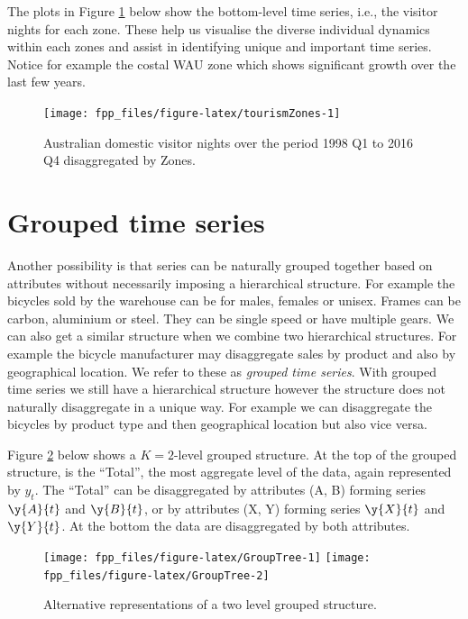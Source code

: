 \documentclass[]{book}
\begin{document}
The plots in Figure \ref{fig:tourismZones} below show the bottom-level time series, i.e., the visitor nights for each zone. These help us visualise the diverse individual dynamics within each zones and assist in identifying unique and important time series. Notice for example the costal WAU zone which shows significant growth over the last few years.

\begin{figure}

{\centering \texttt{[image: fpp\_files/figure-latex/tourismZones-1]} 

}

\caption{Australian domestic visitor nights over the period 1998 Q1 to 2016 Q4 disaggregated by Zones.}\label{fig:tourismZones}
\end{figure}

\hypertarget{Hier:grouped-ts}{%
\section{Grouped time series}\label{Hier:grouped-ts}}

Another possibility is that series can be naturally grouped together based on attributes without necessarily imposing a hierarchical structure. For example the bicycles sold by the warehouse can be for males, females or unisex. Frames can be carbon, aluminium or steel. They can be single speed or have multiple gears. We can also get a similar structure when we combine two hierarchical structures. For example the bicycle manufacturer may disaggregate sales by product and also by geographical location. We refer to these as \emph{grouped time series}. With grouped time series we still have a hierarchical structure however the structure does not naturally disaggregate in a unique way. For example we can disaggregate the bicycles by product type and then geographical location but also vice versa.

Figure \ref{fig:GroupTree} below shows a \(K=2\)-level grouped structure. At the top of the grouped structure, is the ``Total'', the most aggregate level of the data, again represented by \(y_t\). The ``Total'' can be disaggregated by attributes (A, B) forming series \(\y{A}{t}\) and \(\y{B}{t}\), or by attributes (X, Y) forming series \(\y{X}{t}\) and \(\y{Y}{t}\). At the bottom the data are disaggregated by both attributes.

\begin{figure}

{\centering \texttt{[image: fpp\_files/figure-latex/GroupTree-1]} \texttt{[image: fpp\_files/figure-latex/GroupTree-2]} 

}

\caption{Alternative representations of a two level grouped structure.}\label{fig:GroupTree}
\end{figure}
\end{document}
